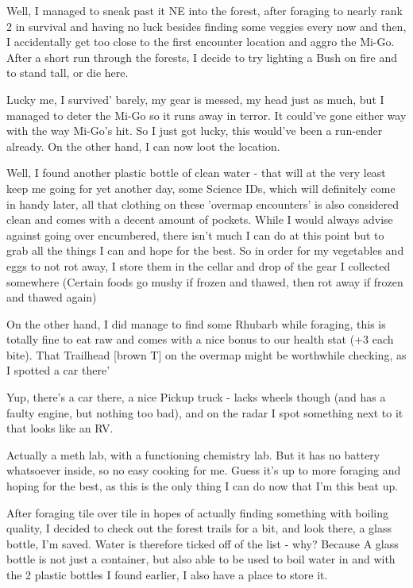 \documentclass[11pt]{report}
\begin{document}
Well, I managed to sneak past it NE into the forest, after foraging to nearly rank 2 in survival and having no luck besides finding some veggies every now and then, I accidentally get too close to the first encounter location and aggro the Mi-Go. After a short run through the forests, I decide to try lighting a Bush on fire and to stand tall, or die here.

Lucky me, I survived' barely, my gear is messed, my head just as much, but I managed to deter the Mi-Go so it runs away in terror. It could've gone either way with the way Mi-Go's hit. So I just got lucky, this would've been a run-ender already. On the other hand, I can now loot the location.

Well, I found another plastic bottle of clean water - that will at the very least keep me going for yet another day, some Science IDs, which will definitely come in handy later, all that clothing on these 'overmap encounters' is also considered clean and comes with a decent amount of pockets. While I would always advise against going over encumbered, there isn't much I can do at this point but to grab all the things I can and hope for the best.
So in order for my vegetables and eggs to not rot away, I store them in the cellar and drop of the gear I collected somewhere (Certain foods go mushy if frozen and thawed, then rot away if frozen and thawed again)

On the other hand, I did manage to find some Rhubarb while foraging, this is totally fine to eat raw and comes with a nice bonus to our health stat (+3 each bite). That Trailhead [brown T] on the overmap might be worthwhile checking, as I spotted a car there'

Yup, there's a car there, a nice Pickup truck - lacks wheels though (and has a faulty engine, but nothing too bad), and on the radar I spot something next to it that looks like an RV.

Actually a meth lab, with a functioning chemistry lab. But it has no battery whatsoever inside, so no easy cooking for me. Guess it's up to more foraging and hoping for the best, as this is the only thing I can do now that I'm this beat up.

After foraging tile over tile in hopes of actually finding something with boiling quality, I decided to check out the forest trails for a bit, and look there, a glass bottle, I'm saved. Water is therefore ticked off of the list - why? Because A glass bottle is not just a container, but also able to be used to boil water in and with the 2 plastic bottles I found earlier, I also have a place to store it.
\end{document}
